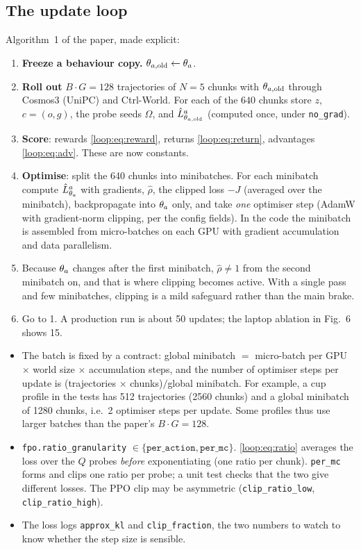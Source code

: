 \subsection{The update loop}
Algorithm~1 of the paper, made explicit:
\begin{enumerate}
\item \textbf{Freeze a behaviour copy.} $\theta_{a,\mathrm{old}}\leftarrow\theta_a$.
\item \textbf{Roll out} $B\cdot G=128$ trajectories of $N=5$ chunks with $\theta_{a,\mathrm{old}}$ through Cosmos3 (UniPC) and Ctrl-World. For each of the $640$ chunks store $z$, $c=(o,g)$, the probe seeds $\Omega$, and $\hat L^{a}_{\theta_{a,\mathrm{old}}}$ (computed once, under \texttt{no\_grad}).
\item \textbf{Score}: rewards \eqref{loop:eq:reward}, returns \eqref{loop:eq:return}, advantages \eqref{loop:eq:adv}. These are now constants.
\item \textbf{Optimise}: split the 640 chunks into minibatches. For each minibatch compute $\hat L^{a}_{\theta_a}$ with gradients, $\hat\rho$, the clipped loss $-J$ (averaged over the minibatch), backpropagate into $\theta_a$ only, and take \emph{one} optimiser step (AdamW with gradient-norm clipping, per the config fields). In the code the minibatch is assembled from micro-batches on each GPU with gradient accumulation and data parallelism.
\item Because $\theta_a$ changes after the first minibatch, $\hat\rho\neq1$ from the second minibatch on, and that is where clipping becomes active. With a single pass and few minibatches, clipping is a mild safeguard rather than the main brake.
\item Go to 1. A production run is about 50 updates; the laptop ablation in Fig.~6 shows 15.
\end{enumerate}

\begin{codenote}
\begin{itemize}[leftmargin=*]
\item The batch is fixed by a contract: global minibatch $=$ micro-batch per GPU $\times$ world size $\times$ accumulation steps, and the number of optimiser steps per update is (trajectories $\times$ chunks)$/$global minibatch. For example, a cup profile in the tests has 512 trajectories (2560 chunks) and a global minibatch of 1280 chunks, i.e.\ 2 optimiser steps per update. Some profiles thus use larger batches than the paper's $B\cdot G=128$.
\item \texttt{fpo.ratio\_granularity} $\in\{\texttt{per\_action},\texttt{per\_mc}\}$. \eqref{loop:eq:ratio} averages the loss over the $Q$ probes \emph{before} exponentiating (one ratio per chunk). \texttt{per\_mc} forms and clips one ratio per probe; a unit test checks that the two give different losses. The PPO clip may be asymmetric (\texttt{clip\_ratio\_low}, \texttt{clip\_ratio\_high}).
\item The loss logs \texttt{approx\_kl} and \texttt{clip\_fraction}, the two numbers to watch to know whether the step size is sensible.
\end{itemize}
\end{codenote}

